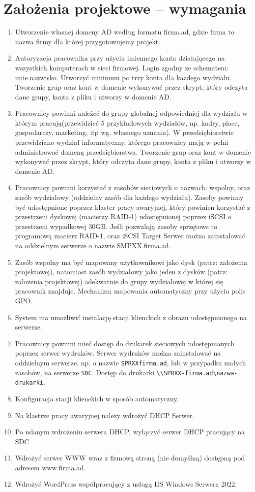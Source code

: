 \section{Założenia projektowe – wymagania}		%
\begin{enumerate}
    \item Utworzenie własnej domeny AD według formatu firma.ad, gdzie firma to nazwa firmy dla której
przygotowujemy projekt.
    \item Autoryzacja pracownika przy użyciu imiennego konta działającego na wszystkich komputerach w
sieci firmowej. Login zgodny ze schematem: imie.nazwisko. Utworzyć minimum po trzy konta dla
każdego wydziału. Tworzenie grup oraz kont w domenie wykonywać przez skrypt, który odczyta
dane grupy, konta z pliku i utworzy w domenie AD. 
    \item Pracownicy powinni należeć do grupy globalnej odpowiedniej dla wydziału w którym
pracują(przewidzieć 5 przykładowych wydziałów, np. kadry, place, gospodarczy, marketing, itp wg.
własnego uznania). W przedsiębiorstwie przewidziano wydział informatyczny, którego pracownicy
mają w pełni administrować domeną przedsiębiorstwa. Tworzenie grup oraz kont w domenie
wykonywać przez skrypt, który odczyta dane grupy, konta z pliku i utworzy w domenie AD. 
    \item Pracownicy powinni korzystać z zasobów sieciowych o nazwach: wspolny, oraz zasób wydziałowy
(oddzielny zasób dla każdego wydziału). Zasoby powinny być udostępnione poprzez klaster pracy
awaryjnej, który powinien korzystać z przestrzeni dyskowej (macierzy RAID-1) udostępnionej
poprzez iSCSI o przestrzeni wypadkowej 30GB. Jeśli pozwalają zasoby sprzętowe to programową
macierz RAID-1, oraz iSCSI Target Serwer można zainstalować na oddzielnym serwerze o nazwie
SMPXX.firma.ad. 
    \item Zasób wspolny ma być mapowany użytkownikowi jako dysk (patrz: założenia projektowej),
natomiast zasób wydziałowy jako jeden z dysków (patrz: założenia projektowej) adekwatnie do
grupy wydziałowej w której się pracownik znajduje. Mechanizm mapowania automatyczny przy
użyciu polis GPO.
    \item System ma umożliwić instalację stacji klienckich z obrazu udostępnionego na serwerze. 
    \item Pracownicy powinni mieć dostęp do drukarek sieciowych udostępnianych poprzez serwer wydruków. Serwer wydruków można zainstalować na oddzielnym serwerze, np. o nazwie \texttt{SPRXXfirma.ad}, lub w przypadku małych zasobów, na serwerze \texttt{SDC}. Dostęp do drukarki \texttt{\textbackslash\textbackslash SPRXX-firma.ad\textbackslash nazwa-drukarki}.
    \newpage
    \item Konfiguracja stacji klienckich w sposób automatyczny. 
    \item Na klastrze pracy awaryjnej należy wdrożyć DHCP Serwer. 
    \item Po udanym wdrożeniu serwera DHCP, wyłączyć serwer DHCP pracujący na SDC
    \item Wdrożyć serwer WWW wraz z firmową stroną (nie domyślną) dostępną pod adresem
www.firma.ad.
    \item Wdrożyć WordPress współpracujący z usługą IIS Windows Serwera 2022.
\end{enumerate}
